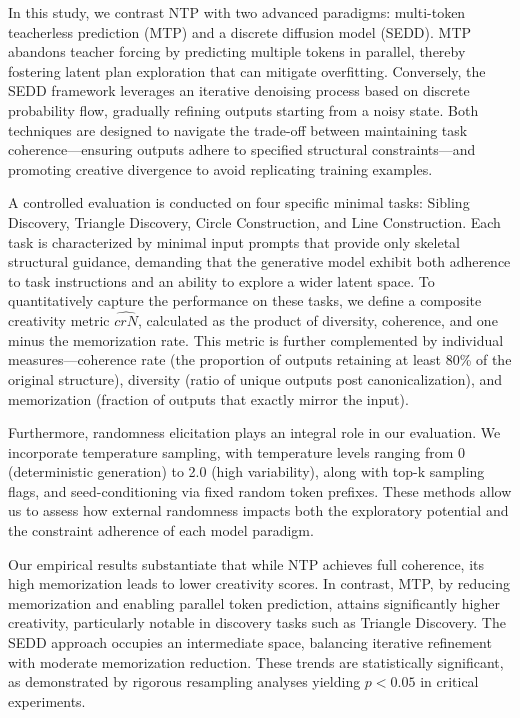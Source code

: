 \documentclass[12pt]{article}
\begin{document}
In this study, we contrast NTP with two advanced paradigms: multi-token teacherless prediction (MTP) and a discrete diffusion model (SEDD). MTP abandons teacher forcing by predicting multiple tokens in parallel, thereby fostering latent plan exploration that can mitigate overfitting. Conversely, the SEDD framework leverages an iterative denoising process based on discrete probability flow, gradually refining outputs starting from a noisy state. Both techniques are designed to navigate the trade-off between maintaining task coherence—ensuring outputs adhere to specified structural constraints—and promoting creative divergence to avoid replicating training examples.

A controlled evaluation is conducted on four specific minimal tasks: Sibling Discovery, Triangle Discovery, Circle Construction, and Line Construction. Each task is characterized by minimal input prompts that provide only skeletal structural guidance, demanding that the generative model exhibit both adherence to task instructions and an ability to explore a wider latent space. To quantitatively capture the performance on these tasks, we define a composite creativity metric \(\hat{crN}\), calculated as the product of diversity, coherence, and one minus the memorization rate. This metric is further complemented by individual measures—coherence rate (the proportion of outputs retaining at least 80\% of the original structure), diversity (ratio of unique outputs post canonicalization), and memorization (fraction of outputs that exactly mirror the input).

Furthermore, randomness elicitation plays an integral role in our evaluation. We incorporate temperature sampling, with temperature levels ranging from 0 (deterministic generation) to 2.0 (high variability), along with top-k sampling flags, and seed-conditioning via fixed random token prefixes. These methods allow us to assess how external randomness impacts both the exploratory potential and the constraint adherence of each model paradigm.

Our empirical results substantiate that while NTP achieves full coherence, its high memorization leads to lower creativity scores. In contrast, MTP, by reducing memorization and enabling parallel token prediction, attains significantly higher creativity, particularly notable in discovery tasks such as Triangle Discovery. The SEDD approach occupies an intermediate space, balancing iterative refinement with moderate memorization reduction. These trends are statistically significant, as demonstrated by rigorous resampling analyses yielding \(p < 0.05\) in critical experiments.
\end{document}
